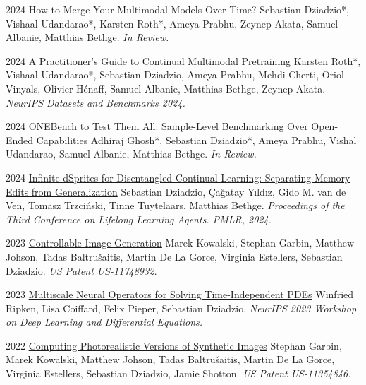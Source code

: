 \documentclass[]{friggeri-cv_osx}
\begin{document}
\begin{entrylist}
\entry
{2024}
{How to Merge Your Multimodal Models Over Time?}
{}
{Sebastian Dziadzio*, Vishaal Udandarao*, Karsten Roth*, Ameya Prabhu, Zeynep Akata, Samuel Albanie, Matthias Bethge.
\textit{In Review.}\\}

\entry
{2024}
{A Practitioner's Guide to Continual Multimodal Pretraining}
{}
{Karsten Roth*, Vishaal Udandarao*, Sebastian Dziadzio, Ameya Prabhu, Mehdi Cherti, Oriol Vinyals, Olivier Hénaff, Samuel Albanie, Matthias Bethge, Zeynep Akata.
\textit{NeurIPS Datasets and Benchmarks 2024.}\\}

\entry
{2024}
{ONEBench to Test Them All: Sample-Level Benchmarking Over Open-Ended Capabilities}
{}
{Adhiraj Ghosh*, Sebastian Dziadzio*, Ameya Prabhu, Vishal Udandarao, Samuel Albanie, Matthias Bethge.
\textit{In Review.}\\}

\entry
{2024}
{\href{https://scholar.google.com/citations?user=8vAIQXoAAAAJ&hl=en}{Infinite dSprites for Disentangled Continual Learning: Separating Memory Edits from Generalization}}
{}
{Sebastian Dziadzio, Çağatay Yıldız, Gido M. van de Ven, Tomasz Trzciński, Tinne Tuytelaars, Matthias Bethge.
\textit{Proceedings of the Third Conference on Lifelong Learning Agents. PMLR, 2024.}\\}

\entry
{2023}
{\href{https://scholar.google.com/citations?user=8vAIQXoAAAAJ&hl=en}{Controllable Image Generation}}
{}
{Marek Kowalski, Stephan Garbin, Matthew Johson, Tadas Baltru\v{s}aitis, Martin De La Gorce, Virginia Estellers, Sebastian Dziadzio.
\textit{US Patent US-11748932.}\\}

\entry
{2023}
{\href{https://scholar.google.com/citations?user=8vAIQXoAAAAJ&hl=en}{Multiscale Neural Operators for Solving Time-Independent PDEs}}
{}
{Winfried Ripken, Lisa Coiffard, Felix Pieper, Sebastian Dziadzio.
\textit{NeurIPS 2023 Workshop on Deep Learning and Differential Equations.}\\}

\entry
{2022}
{\href{https://scholar.google.com/citations?user=8vAIQXoAAAAJ&hl=en}{Computing Photorealistic Versions of Synthetic Images}}
{}
{Stephan Garbin, Marek Kowalski, Matthew Johson, Tadas Baltru\v{s}aitis, Martin De La Gorce, Virginia Estellers, Sebastian Dziadzio, Jamie Shotton.
\textit{US Patent US-11354846.}\\}


\end{entrylist}
\end{document}
